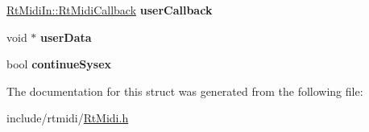 \begin{DoxyCompactItemize}
\item 
\hyperlink{class_rt_midi_in_aac5c0da1ec6f97fe43d5189bad00caef}{Rt\+Midi\+In\+::\+Rt\+Midi\+Callback} {\bfseries user\+Callback}\hypertarget{struct_midi_in_api_1_1_rt_midi_in_data_ac84f3df4914220095bbeda364556325f}{}\label{struct_midi_in_api_1_1_rt_midi_in_data_ac84f3df4914220095bbeda364556325f}

\item 
void $\ast$ {\bfseries user\+Data}\hypertarget{struct_midi_in_api_1_1_rt_midi_in_data_a5ec1653c816234ffb896289eb7eb47e7}{}\label{struct_midi_in_api_1_1_rt_midi_in_data_a5ec1653c816234ffb896289eb7eb47e7}

\item 
bool {\bfseries continue\+Sysex}\hypertarget{struct_midi_in_api_1_1_rt_midi_in_data_a60c8fc25d8838784d0d1904f31e80ab5}{}\label{struct_midi_in_api_1_1_rt_midi_in_data_a60c8fc25d8838784d0d1904f31e80ab5}

\end{DoxyCompactItemize}


The documentation for this struct was generated from the following file\+:\begin{DoxyCompactItemize}
\item 
include/rtmidi/\hyperlink{_rt_midi_8h}{Rt\+Midi.\+h}\end{DoxyCompactItemize}
